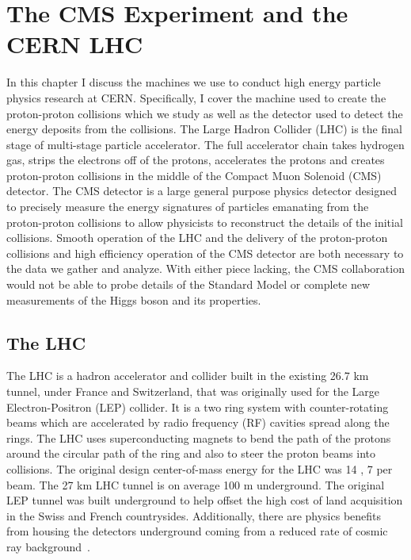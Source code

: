 \chapter{The CMS Experiment and the CERN LHC}
\label{sec:cms_lhc}
In this chapter I discuss the machines we use to conduct high energy particle
physics research at CERN. Specifically, I cover the machine used to create the
proton-proton collisions which we study as well as the
detector used to detect the energy deposits from the collisions. The Large Hadron
Collider (LHC) is the final stage of multi-stage particle accelerator. The full
accelerator chain takes hydrogen gas, strips the electrons off of the protons,
accelerates the protons and creates proton-proton collisions in the middle of the
Compact Muon Solenoid (CMS) detector. The CMS detector is a large general purpose 
physics detector designed to precisely measure the energy signatures of particles
emanating from the proton-proton collisions to allow physicists to reconstruct
the details of the initial collisions. Smooth operation of the LHC and the delivery
of the proton-proton collisions and high efficiency operation of the CMS detector
are both necessary to the data we gather and analyze. With either piece lacking,
the CMS collaboration would not be able to probe details of the Standard Model
or complete new measurements of the Higgs boson and its properties.


\section{The LHC}
The LHC is a hadron accelerator and collider built in the existing 26.7 km tunnel,
under France and Switzerland, that was originally used for the Large Electron-Positron (LEP)
collider. It is a two ring system with counter-rotating beams which are accelerated by
radio frequency (RF) cavities spread along the rings. The LHC uses superconducting magnets to 
bend the path of the protons around the circular path of the ring and also to steer
the proton beams into collisions. The original design center-of-mass energy for the LHC
was 14 \TeV, 7 \TeV per beam. The 27 km LHC tunnel is on average 100 m underground.
The original LEP tunnel was built underground to help offset the high cost of land
acquisition in the Swiss and French countrysides. Additionally, there are physics
benefits from housing the detectors underground coming from a reduced rate of cosmic
ray background~\cite{Voss:2009zz}.

